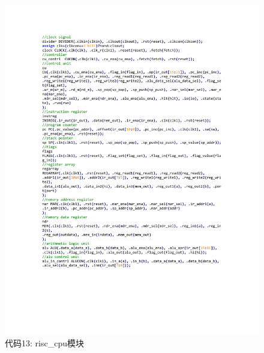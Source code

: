 \documentclass[titlepage, 11pt]{article}
\begin{document}
				\begin{figure}[H]
				\centering
				\includegraphics[scale=1.05]{36.pdf}
				\caption*{代码13: risc\_cpu模块}
			\end{figure}
\end{document}
